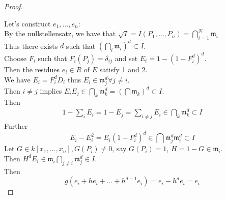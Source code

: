 \documentclass[../main.tex]{subfiles}
\begin{document}
\begin{proof}
\begin{enumerate}
		
	\end{enumerate}
	Let's construct $e_1,\ldots, e_n$:\\
	By the nullstellensatz, we have that $ \sqrt{I} = I( P_1,\ldots,P_n) = \bigcap_{i=1}^{N} \mathfrak{m}_i$\\
	Thus there exists $d$ such that $( \bigcap_{i} \mathfrak{m}_i)^{d} \subset I$.\\
	Choose $F_i$ such that $F_i( P_j) = \delta_{ij} $ and set $ E_i = 1- ( 1-F_i^{d})^{d}$.\\
	Then the residues $e_i\in R$ of $E$ satisfy 1 and 2.\\
	We have $E_i = F_i^{d}D_i$ thus $E_i \in \mathfrak{m}_j^{d}\forall j \neq i$.\\
	Then $i\neq j$ implies $E_i E_j \in \bigcap_k\mathfrak{m}_k^{d}= ( \bigcap \mathfrak{m}_k)^{d }\subset I $.\\
	Then 
	\begin{align*}
		1- \sum_i E_i = 1- E_j = \sum_{i\neq j} E_i\in \bigcap_k \mathfrak{m}_k^{d} \subset I
	\end{align*}
	Further
	\[ 
		E_i - E_i^{2} = E_i ( 1- F_i^{d})^{d} \in \bigcap \mathfrak{m}_j^{d} \mathfrak{m}_i^{d}\subset I
	\]
	Let $G\in k[x_1,\ldots,x_n], G( P_i) \neq 0$, say $G( P_i) =1$, $H= 1-G\in \mathfrak{m}_i$.\\
	Then $H^{d}E_i \in \mathfrak{m}_i \bigcap_{j\neq i} \mathfrak{m}_j^{d}\in I$.\\
	Then 
	\[ 
	g( e_i + he_i + \ldots + h^{d-1}e_i) = e_i - h^{d}e_i = e_i 
	\]
	
	

	
\end{proof}
\end{document}
